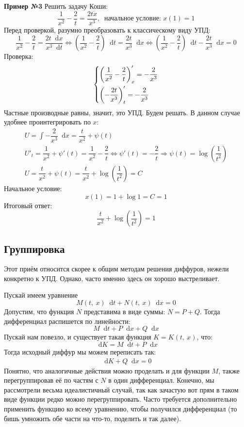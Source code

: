 \documentclass[a4paper,12pt]{article}
\renewcommand*\d{\mathop{}\!\mathrm{d}}
\newcommand{\dx}{\dot{x}}
\newcommand{\ds}{\displaystyle}
\begin{document}
\textbf{Пример №3}
Решить задачу Коши:
\[\dfrac{1}{x^2} - \dfrac{2}{t} = \dfrac{2t\dx}{x^3},\ \text{ начальное условие: }x(1) = 1\]
Перед проверкой, разумно преобразовать к классическому виду УПД:
\[\dfrac{1}{x^2} - \dfrac{2}{t} = \dfrac{2t\d x}{x^3\d t} \iff \left(\dfrac{1}{x^2} - \dfrac{2}{t}\right)\d t =  \dfrac{2t}{x^3}\d x \iff \left(\dfrac{1}{x^2} - \dfrac{2}{t}\right)\d t - \dfrac{2t}{x^3}\d x = 0\]
Проверка:
\[\left\{\begin{gathered}
\left(\dfrac{1}{x^2} - \dfrac{2}{t}\right)'_x  = -\dfrac{2}{x^3}\hfill\\
\left(- \dfrac{2t}{x^3}\right)'_t = -\dfrac{2}{x^3}\hfill
\end{gathered}\right.\]
Частные производные равны, значит, это УПД. Будем решать. В данном случае удобнее проинтегрировать по $x$:
\begin{gather*}
	U = \ds\int -\dfrac{2}{x^3}\d x = \dfrac{t}{x^2} + \psi(t)\\
	U'_t = \dfrac{1}{x^2} + \psi'(t) = \dfrac{1}{x^2} - \dfrac{2}{t}\iff \psi'(t) = -\dfrac{2}{t} \Longrightarrow \psi(t) = \log(\dfrac{1}{t^2})\\
	U =  \dfrac{t}{x^2} + \psi(t) = \dfrac{t}{x^2} + \log(\dfrac{1}{t^2}) = C
\end{gather*}
Начальное условие:
\[x(1) = 1 + \log 1 = C  = 1\]
Итоговый ответ:
\[\dfrac{t}{x^2} + \log(\dfrac{1}{t^2}) = 1\]

\subsection{Группировка}

Этот приём относится скорее к общим методам решения диффуров, нежели конкретно к УПД. Однако, часто именно здесь он хорошо выстреливает. 

Пускай имеем уравнение
\[M(t,\ x)\d t + N(t,\ x)\d x = 0\]
Допустим, что функция $N$ представима в виде суммы: $N = P + Q$. Тогда дифференциал распишется по линейности:
\[M\d t + P\d x + Q\d x\]
Пускай нам повезло, и существует такая функция $K = K(t,\ x)$, что:
\[\d K = M\d t + P\d x\]
Тогда исходный диффур мы можем переписать так:
\begin{gather*}
\d K + Q\d x = 0
\end{gather*}
Понятно, что аналогичные действия можно проделать и для функции $M$, также перегруппировав её по частям с $N$ в один дифференциал. Конечно, мы рассмотрели весьма идеалистичный случай, так как зачастую вот прям в таком виде функции редко можно перегруппировать. Часто требуется дополнительно применить функцию ко всему уравнению, чтобы получился дифференциал (то бишь умножить обе части на что-то, поделить и так далее).
\end{document}
